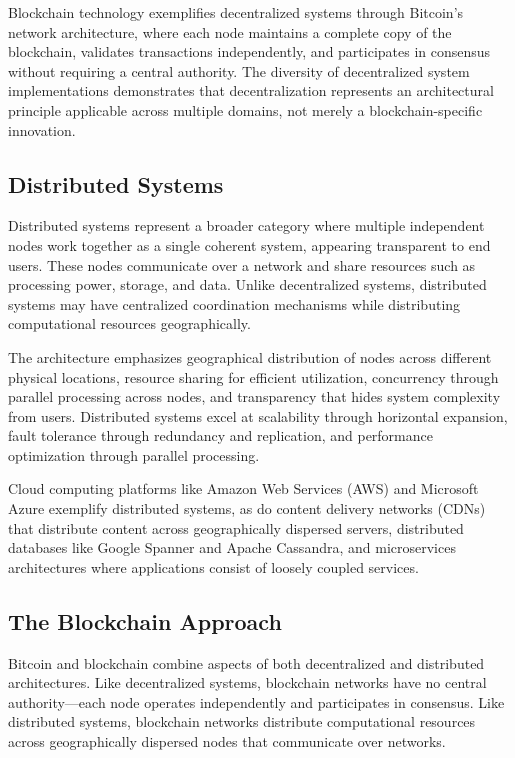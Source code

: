 Blockchain technology exemplifies decentralized systems through Bitcoin's network architecture, where each node maintains a complete copy of the blockchain, validates transactions independently, and participates in consensus without requiring a central authority. The diversity of decentralized system implementations demonstrates that decentralization represents an architectural principle applicable across multiple domains, not merely a blockchain-specific innovation.

\subsection{Distributed Systems}
\label{subsec:distributed}

Distributed systems represent a broader category where multiple independent nodes work together as a single coherent system, appearing transparent to end users. These nodes communicate over a network and share resources such as processing power, storage, and data. Unlike decentralized systems, distributed systems may have centralized coordination mechanisms while distributing computational resources geographically.

The architecture emphasizes geographical distribution of nodes across different physical locations, resource sharing for efficient utilization, concurrency through parallel processing across nodes, and transparency that hides system complexity from users. Distributed systems excel at scalability through horizontal expansion, fault tolerance through redundancy and replication, and performance optimization through parallel processing.

Cloud computing platforms like Amazon Web Services (AWS) and Microsoft Azure exemplify distributed systems, as do content delivery networks (CDNs) that distribute content across geographically dispersed servers, distributed databases like Google Spanner and Apache Cassandra, and microservices architectures where applications consist of loosely coupled services.

\subsection{The Blockchain Approach}
\label{subsec:blockchain-approach}

Bitcoin and blockchain combine aspects of both decentralized and distributed architectures. Like decentralized systems, blockchain networks have no central authority---each node operates independently and participates in consensus. Like distributed systems, blockchain networks distribute computational resources across geographically dispersed nodes that communicate over networks.

